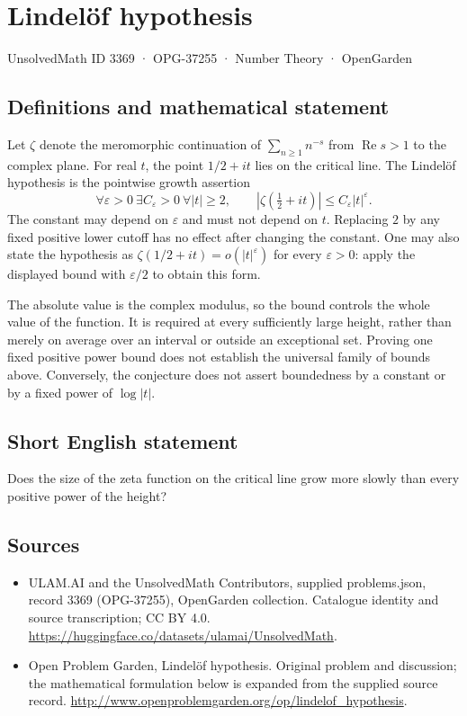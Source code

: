 \documentclass[11pt,a4paper]{article}
\begin{document}
\section*{Lindelöf hypothesis}\label{3369}
{\small UnsolvedMath ID 3369 · OPG-37255 · Number Theory · OpenGarden}
\subsection{Definitions and mathematical statement}
Let $\zeta$ denote the meromorphic continuation of
$\sum_{n\ge1}n^{-s}$ from $\operatorname{Re}s>1$ to the complex plane.
For real $t$, the point $1/2+it$ lies on the critical line. The
Lindel\"of hypothesis is the pointwise growth assertion
\[
 \forall\varepsilon>0\ \exists C_\varepsilon>0\ \forall |t|\ge2,
 \qquad |\zeta(\tfrac12+it)|\le C_\varepsilon |t|^\varepsilon.
\]
The constant may depend on $\varepsilon$ and must not depend on $t$.
Replacing $2$ by any fixed positive lower cutoff has no effect after
changing the constant. One may also state the hypothesis as
$\zeta(1/2+it)=o(|t|^\varepsilon)$ for every $\varepsilon>0$:
apply the displayed bound with $\varepsilon/2$ to obtain this form.

The absolute value is the complex modulus, so the bound controls the
whole value of the function. It is required at every sufficiently
large height, rather than merely on average over an interval or
outside an exceptional set. Proving one fixed positive power bound
does not establish the universal family of bounds above. Conversely,
the conjecture does not assert boundedness by a constant or by a
fixed power of $\log |t|$.
\subsection{Short English statement}
Does the size of the zeta function on the critical line grow more slowly than every positive power of the height?
\subsection{Sources}
\begin{itemize}
\item[S1] ULAM.AI and the UnsolvedMath Contributors, supplied problems.json, record 3369 (OPG-37255), OpenGarden collection. Catalogue identity and source transcription; CC BY 4.0.
\url{https://huggingface.co/datasets/ulamai/UnsolvedMath}.
\item[S2] Open Problem Garden, Lindelöf hypothesis. Original problem and discussion; the mathematical formulation below is expanded from the supplied source record.
\url{http://www.openproblemgarden.org/op/lindelof_hypothesis}.
\end{itemize}
\end{document}
